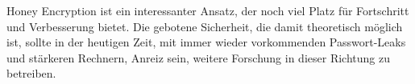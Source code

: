 Honey Encryption ist ein interessanter Ansatz, der noch viel Platz für Fortschritt und Verbesserung bietet. Die gebotene Sicherheit, die damit theoretisch möglich ist, sollte in der heutigen Zeit, mit immer wieder vorkommenden Passwort-Leaks und stärkeren Rechnern, Anreiz sein, weitere Forschung in dieser Richtung zu betreiben.
